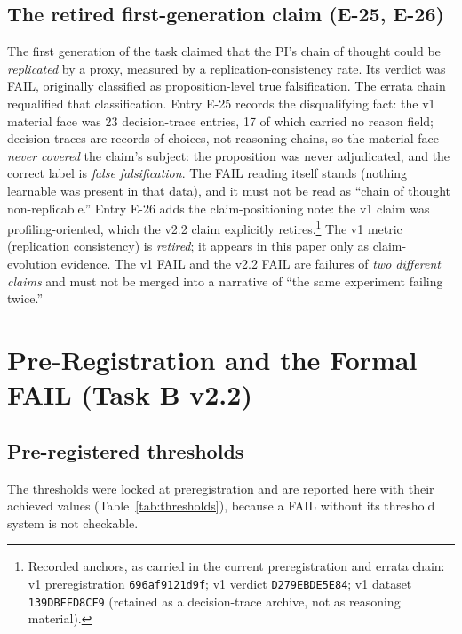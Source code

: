 \documentclass[11pt]{article}
\newcommand{\sha}[1]{\texttt{#1}}
\begin{document}
\subsection{The retired first-generation claim (E-25, E-26)}

The first generation of the task claimed that the PI's chain of thought could be \emph{replicated} by a proxy, measured by a replication-consistency rate. Its verdict was FAIL, originally classified as proposition-level true falsification. The errata chain requalified that classification. Entry E-25 records the disqualifying fact: the v1 material face was 23 decision-trace entries, 17 of which carried no reason field; decision traces are records of choices, not reasoning chains, so the material face \emph{never covered} the claim's subject: the proposition was never adjudicated, and the correct label is \emph{false falsification}. The FAIL reading itself stands (nothing learnable was present in that data), and it must not be read as ``chain of thought non-replicable.'' Entry E-26 adds the claim-positioning note: the v1 claim was profiling-oriented, which the v2.2 claim explicitly retires.\footnote{Recorded anchors, as carried in the current preregistration and errata chain: v1 preregistration \sha{696af9121d9f}; v1 verdict \sha{D279EBDE5E84}; v1 dataset \sha{139DBFFD8CF9} (retained as a decision-trace archive, not as reasoning material).} The v1 metric (replication consistency) is \emph{retired}; it appears in this paper only as claim-evolution evidence. The v1 FAIL and the v2.2 FAIL are failures of \emph{two different claims} and must not be merged into a narrative of ``the same experiment failing twice.''

\section{Pre-Registration and the Formal FAIL (Task B v2.2)}\label{sec:fail}

\subsection{Pre-registered thresholds}

The thresholds were locked at preregistration and are reported here with their achieved values (Table~\ref{tab:thresholds}), because a FAIL without its threshold system is not checkable.
\end{document}
